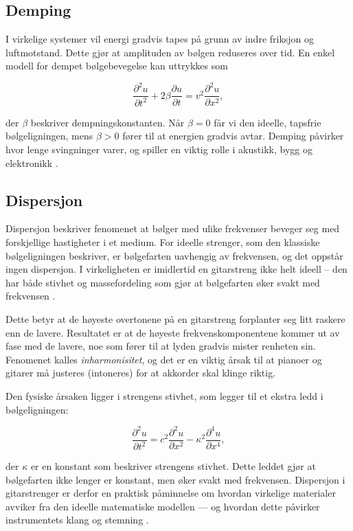 \subsection{Demping}

I virkelige systemer vil energi gradvis tapes på grunn av indre friksjon og luftmotstand.  
Dette gjør at amplituden av bølgen reduseres over tid.  
En enkel modell for dempet bølgebevegelse kan uttrykkes som

\begin{equation*}
\frac{\partial^2 u}{\partial t^2} + 2\beta \frac{\partial u}{\partial t} = v^2 \frac{\partial^2 u}{\partial x^2},
\end{equation*}

der $\beta$ beskriver dempningskonstanten.  
Når $\beta = 0$ får vi den ideelle, tapsfrie bølgeligningen, mens $\beta > 0$ fører til at energien gradvis avtar.  
Demping påvirker hvor lenge svingninger varer, og spiller en viktig rolle i akustikk, bygg og elektronikk \parencite{libretextsDamping}.

\subsection{Dispersjon}

Dispersjon beskriver fenomenet at bølger med ulike frekvenser beveger seg med forskjellige hastigheter i et medium.  
For ideelle strenger, som den klassiske bølgeligningen beskriver, er bølgefarten uavhengig av frekvensen, og det oppstår ingen dispersjon.  
I virkeligheten er imidlertid en gitarstreng ikke helt ideell – den har både stivhet og massefordeling som gjør at bølgefarten øker svakt med frekvensen \parencite{kartofelev2019dispersive}.  

Dette betyr at de høyeste overtonene på en gitarstreng forplanter seg litt raskere enn de lavere.  
Resultatet er at de høyeste frekvenskomponentene kommer ut av fase med de lavere, noe som fører til at lyden gradvis mister renheten sin.  
Fenomenet kalles \textit{inharmonisitet}, og det er en viktig årsak til at pianoer og gitarer må justeres (intoneres) for at akkorder skal klinge riktig.  

Den fysiske årsaken ligger i strengens stivhet, som legger til et ekstra ledd i bølgeligningen:  

\begin{equation*}
\frac{\partial^2 u}{\partial t^2} = c^2 \frac{\partial^2 u}{\partial x^2} - \kappa^2 \frac{\partial^4 u}{\partial x^4},
\end{equation*}

der $\kappa$ er en konstant som beskriver strengens stivhet.  
Dette leddet gjør at bølgefarten ikke lenger er konstant, men øker svakt med frekvensen.  
Dispersjon i gitarstrenger er derfor en praktisk påminnelse om hvordan virkelige materialer avviker fra den ideelle matematiske modellen — og hvordan dette påvirker instrumentets klang og stemning \parencite{kartofelev2019dispersive, unswStringsHarmonics, wikipediaInharmonicity}.

